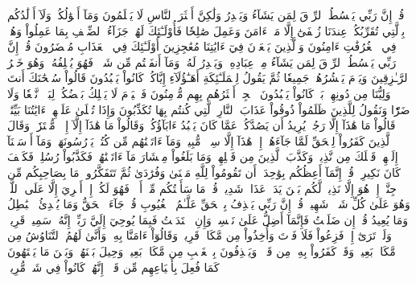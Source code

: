 قُلۡ إِنَّ رَبِّي يَبۡسُطُ ٱلرِّزۡقَ لِمَن يَشَآءُ وَيَقۡدِرُ وَلَٰكِنَّ أَكۡثَرَ ٱلنَّاسِ لَا يَعۡلَمُونَ
وَمَآ أَمۡوَٰلُكُمۡ وَلَآ أَوۡلَٰدُكُم بِٱلَّتِي تُقَرِّبُكُمۡ عِندَنَا زُلۡفَىٰٓ إِلَّا مَنۡ ءَامَنَ وَعَمِلَ صَٰلِحٗا فَأُوْلَـٰٓئِكَ لَهُمۡ جَزَآءُ ٱلضِّعۡفِ بِمَا عَمِلُواْ وَهُمۡ فِي ٱلۡغُرُفَٰتِ ءَامِنُونَ
وَٱلَّذِينَ يَسۡعَوۡنَ فِيٓ ءَايَٰتِنَا مُعَٰجِزِينَ أُوْلَـٰٓئِكَ فِي ٱلۡعَذَابِ مُحۡضَرُونَ
قُلۡ إِنَّ رَبِّي يَبۡسُطُ ٱلرِّزۡقَ لِمَن يَشَآءُ مِنۡ عِبَادِهِۦ وَيَقۡدِرُ لَهُۥۚ وَمَآ أَنفَقۡتُم مِّن شَيۡءٖ فَهُوَ يُخۡلِفُهُۥۖ وَهُوَ خَيۡرُ ٱلرَّـٰزِقِينَ
وَيَوۡمَ يَحۡشُرُهُمۡ جَمِيعٗا ثُمَّ يَقُولُ لِلۡمَلَـٰٓئِكَةِ أَهَـٰٓؤُلَآءِ إِيَّاكُمۡ كَانُواْ يَعۡبُدُونَ
قَالُواْ سُبۡحَٰنَكَ أَنتَ وَلِيُّنَا مِن دُونِهِمۖ بَلۡ كَانُواْ يَعۡبُدُونَ ٱلۡجِنَّۖ أَكۡثَرُهُم بِهِم مُّؤۡمِنُونَ
فَٱلۡيَوۡمَ لَا يَمۡلِكُ بَعۡضُكُمۡ لِبَعۡضٖ نَّفۡعٗا وَلَا ضَرّٗا وَنَقُولُ لِلَّذِينَ ظَلَمُواْ ذُوقُواْ عَذَابَ ٱلنَّارِ ٱلَّتِي كُنتُم بِهَا تُكَذِّبُونَ
وَإِذَا تُتۡلَىٰ عَلَيۡهِمۡ ءَايَٰتُنَا بَيِّنَٰتٖ قَالُواْ مَا هَٰذَآ إِلَّا رَجُلٞ يُرِيدُ أَن يَصُدَّكُمۡ عَمَّا كَانَ يَعۡبُدُ ءَابَآؤُكُمۡ وَقَالُواْ مَا هَٰذَآ إِلَّآ إِفۡكٞ مُّفۡتَرٗىۚ وَقَالَ ٱلَّذِينَ كَفَرُواْ لِلۡحَقِّ لَمَّا جَآءَهُمۡ إِنۡ هَٰذَآ إِلَّا سِحۡرٞ مُّبِينٞ
وَمَآ ءَاتَيۡنَٰهُم مِّن كُتُبٖ يَدۡرُسُونَهَاۖ وَمَآ أَرۡسَلۡنَآ إِلَيۡهِمۡ قَبۡلَكَ مِن نَّذِيرٖ
وَكَذَّبَ ٱلَّذِينَ مِن قَبۡلِهِمۡ وَمَا بَلَغُواْ مِعۡشَارَ مَآ ءَاتَيۡنَٰهُمۡ فَكَذَّبُواْ رُسُلِيۖ فَكَيۡفَ كَانَ نَكِيرِ
۞قُلۡ إِنَّمَآ أَعِظُكُم بِوَٰحِدَةٍۖ أَن تَقُومُواْ لِلَّهِ مَثۡنَىٰ وَفُرَٰدَىٰ ثُمَّ تَتَفَكَّرُواْۚ مَا بِصَاحِبِكُم مِّن جِنَّةٍۚ إِنۡ هُوَ إِلَّا نَذِيرٞ لَّكُم بَيۡنَ يَدَيۡ عَذَابٖ شَدِيدٖ
قُلۡ مَا سَأَلۡتُكُم مِّنۡ أَجۡرٖ فَهُوَ لَكُمۡۖ إِنۡ أَجۡرِيَ إِلَّا عَلَى ٱللَّهِۖ وَهُوَ عَلَىٰ كُلِّ شَيۡءٖ شَهِيدٞ
قُلۡ إِنَّ رَبِّي يَقۡذِفُ بِٱلۡحَقِّ عَلَّـٰمُ ٱلۡغُيُوبِ
قُلۡ جَآءَ ٱلۡحَقُّ وَمَا يُبۡدِئُ ٱلۡبَٰطِلُ وَمَا يُعِيدُ
قُلۡ إِن ضَلَلۡتُ فَإِنَّمَآ أَضِلُّ عَلَىٰ نَفۡسِيۖ وَإِنِ ٱهۡتَدَيۡتُ فَبِمَا يُوحِيٓ إِلَيَّ رَبِّيٓۚ إِنَّهُۥ سَمِيعٞ قَرِيبٞ
وَلَوۡ تَرَىٰٓ إِذۡ فَزِعُواْ فَلَا فَوۡتَ وَأُخِذُواْ مِن مَّكَانٖ قَرِيبٖ
وَقَالُوٓاْ ءَامَنَّا بِهِۦ وَأَنَّىٰ لَهُمُ ٱلتَّنَاوُشُ مِن مَّكَانِۭ بَعِيدٖ
وَقَدۡ كَفَرُواْ بِهِۦ مِن قَبۡلُۖ وَيَقۡذِفُونَ بِٱلۡغَيۡبِ مِن مَّكَانِۭ بَعِيدٖ
وَحِيلَ بَيۡنَهُمۡ وَبَيۡنَ مَا يَشۡتَهُونَ كَمَا فُعِلَ بِأَشۡيَاعِهِم مِّن قَبۡلُۚ إِنَّهُمۡ كَانُواْ فِي شَكّٖ مُّرِيبِۭ